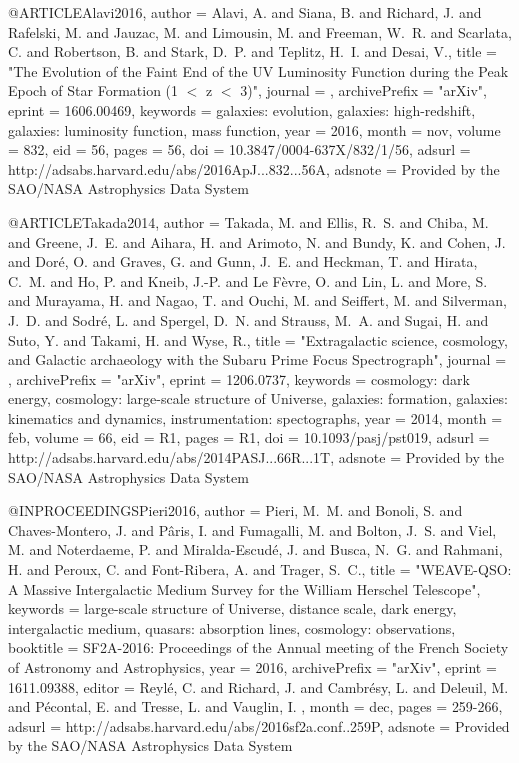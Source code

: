 \documentclass{aa}
\begin{document}
{{{{{{{{{{{{{@ARTICLE{Alavi2016,
   author = {{Alavi}, A. and {Siana}, B. and {Richard}, J. and {Rafelski}, M. and 
	{Jauzac}, M. and {Limousin}, M. and {Freeman}, W.~R. and {Scarlata}, C. and 
	{Robertson}, B. and {Stark}, D.~P. and {Teplitz}, H.~I. and 
	{Desai}, V.},
    title = "{The Evolution of the Faint End of the UV Luminosity Function during the Peak Epoch of Star Formation (1 $\lt$ z $\lt$ 3)}",
  journal = {\apj},
archivePrefix = "arXiv",
   eprint = {1606.00469},
 keywords = {galaxies: evolution, galaxies: high-redshift, galaxies: luminosity function, mass function},
     year = 2016,
    month = nov,
   volume = 832,
      eid = {56},
    pages = {56},
      doi = {10.3847/0004-637X/832/1/56},
   adsurl = {http://adsabs.harvard.edu/abs/2016ApJ...832...56A},
  adsnote = {Provided by the SAO/NASA Astrophysics Data System}
}

@ARTICLE{Takada2014,
   author = {{Takada}, M. and {Ellis}, R.~S. and {Chiba}, M. and {Greene}, J.~E. and 
	{Aihara}, H. and {Arimoto}, N. and {Bundy}, K. and {Cohen}, J. and 
	{Dor{\'e}}, O. and {Graves}, G. and {Gunn}, J.~E. and {Heckman}, T. and 
	{Hirata}, C.~M. and {Ho}, P. and {Kneib}, J.-P. and {Le F{\`e}vre}, O. and 
	{Lin}, L. and {More}, S. and {Murayama}, H. and {Nagao}, T. and 
	{Ouchi}, M. and {Seiffert}, M. and {Silverman}, J.~D. and {Sodr{\'e}}, L. and 
	{Spergel}, D.~N. and {Strauss}, M.~A. and {Sugai}, H. and {Suto}, Y. and 
	{Takami}, H. and {Wyse}, R.},
    title = "{Extragalactic science, cosmology, and Galactic archaeology with the Subaru Prime Focus Spectrograph}",
  journal = {\pasj},
archivePrefix = "arXiv",
   eprint = {1206.0737},
 keywords = {cosmology: dark energy, cosmology: large-scale structure of Universe, galaxies: formation, galaxies: kinematics and dynamics, instrumentation: spectographs},
     year = 2014,
    month = feb,
   volume = 66,
      eid = {R1},
    pages = {R1},
      doi = {10.1093/pasj/pst019},
   adsurl = {http://adsabs.harvard.edu/abs/2014PASJ...66R...1T},
  adsnote = {Provided by the SAO/NASA Astrophysics Data System}
}


@INPROCEEDINGS{Pieri2016,
   author = {{Pieri}, M.~M. and {Bonoli}, S. and {Chaves-Montero}, J. and 
	{P{\^a}ris}, I. and {Fumagalli}, M. and {Bolton}, J.~S. and 
	{Viel}, M. and {Noterdaeme}, P. and {Miralda-Escud{\'e}}, J. and 
	{Busca}, N.~G. and {Rahmani}, H. and {Peroux}, C. and {Font-Ribera}, A. and 
	{Trager}, S.~C.},
    title = "{WEAVE-QSO: A Massive Intergalactic Medium Survey for the William Herschel Telescope}",
 keywords = {large-scale structure of Universe, distance scale, dark energy, intergalactic medium, quasars: absorption lines, cosmology: observations},
booktitle = {SF2A-2016: Proceedings of the Annual meeting of the French Society of Astronomy and Astrophysics},
     year = 2016,
archivePrefix = "arXiv",
   eprint = {1611.09388},
   editor = {{Reyl{\'e}}, C. and {Richard}, J. and {Cambr{\'e}sy}, L. and 
	{Deleuil}, M. and {P{\'e}contal}, E. and {Tresse}, L. and {Vauglin}, I.
	},
    month = dec,
    pages = {259-266},
   adsurl = {http://adsabs.harvard.edu/abs/2016sf2a.conf..259P},
  adsnote = {Provided by the SAO/NASA Astrophysics Data System}
}

}}}}}}}}}}}}}
\end{document}
